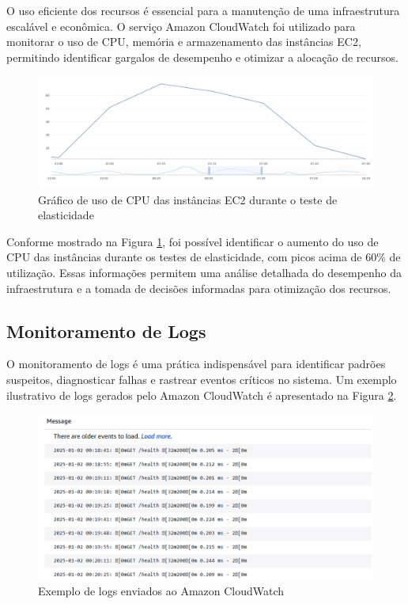 O uso eficiente dos recursos é essencial para a manutenção de uma infraestrutura escalável e econômica. O serviço Amazon CloudWatch foi utilizado para monitorar o uso de CPU, memória e armazenamento das instâncias EC2, permitindo identificar gargalos de desempenho e otimizar a alocação de recursos.

\begin{figure}[H] 
    \centering 
    \includegraphics[width=1\textwidth]{assets/elasticity-test/cpu-usage.png}
    \caption{Gráfico de uso de CPU das instâncias EC2 durante o teste de elasticidade}
    \label{fig:elasticity-cpu-usage} 
\end{figure}

Conforme mostrado na Figura \ref{fig:elasticity-cpu-usage}, foi possível identificar o aumento do uso de CPU das instâncias durante os testes de elasticidade, com picos acima de 60\% de utilização. Essas informações permitem uma análise detalhada do desempenho da infraestrutura e a tomada de decisões informadas para otimização dos recursos.

\subsection{Monitoramento de Logs}

O monitoramento de logs é uma prática indispensável para identificar padrões suspeitos, diagnosticar falhas e rastrear eventos críticos no sistema. Um exemplo ilustrativo de logs gerados pelo Amazon CloudWatch é apresentado na Figura \ref{fig:cloudwatch-logs}.

\begin{figure}[H]
    \centering
    \includegraphics[width=1\textwidth]{assets/monitoring-test/cloudwatch-logs.png}
    \caption{Exemplo de logs enviados ao Amazon CloudWatch}
    \label{fig:cloudwatch-logs}
\end{figure}

